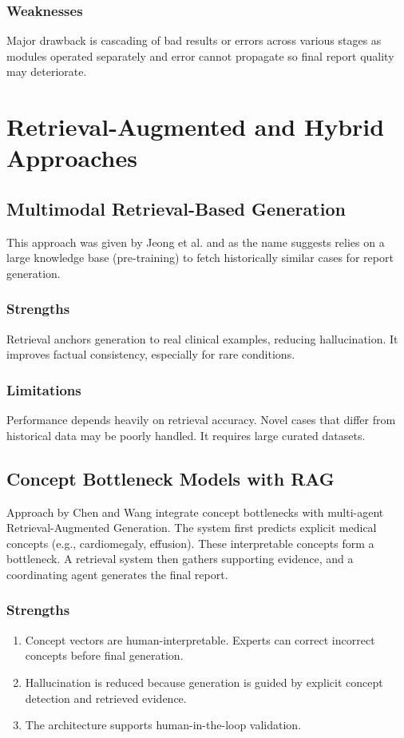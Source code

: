 \subsubsection{Weaknesses}
Major drawback is cascading of bad results or errors across various stages as modules operated separately and error cannot propagate so final report quality may deteriorate.

\section{Retrieval-Augmented and Hybrid Approaches}
\subsection{Multimodal Retrieval-Based Generation}
This approach was given by Jeong et al. and as the name suggests relies on a large knowledge base (pre-training) to fetch historically similar cases for report generation.
\subsubsection{Strengths}
Retrieval anchors generation to real clinical examples, reducing hallucination. It improves factual consistency, especially for rare conditions.
\subsubsection{Limitations}
Performance depends heavily on retrieval accuracy. Novel cases that differ from historical data may be poorly handled.
It requires large curated datasets.
\subsection{Concept Bottleneck Models with RAG}
Approach by Chen and Wang integrate concept bottlenecks with multi-agent Retrieval-Augmented Generation.
The system first predicts explicit medical concepts (e.g., cardiomegaly, effusion). These interpretable concepts form a bottleneck. A retrieval system then gathers supporting evidence, and a coordinating agent generates the final report.
\subsubsection{Strengths}
\begin{enumerate}
    \item Concept vectors are human-interpretable. Experts can correct incorrect concepts before final generation.
    \item Hallucination is reduced because generation is guided by explicit concept detection and retrieved evidence.
    \item The architecture supports human-in-the-loop validation.

\end{enumerate}
